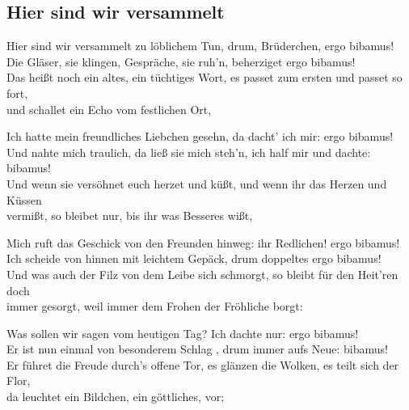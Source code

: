 
\subsection*{Hier sind wir versammelt}
%
%

\thestrophe Hier sind wir versammelt zu löblichem Tun, drum, Brüderchen, ergo bibamus! \\
Die Gläser, sie klingen, Gespräche, sie ruh'n, beherziget ergo bibamus! \\
Das heißt noch ein altes, ein tüchtiges Wort, es passet zum ersten und passet so fort, \\
und schallet ein Echo vom festlichen Ort, 

\thestrophe Ich hatte mein freundliches Liebchen gesehn, da dacht' ich mir: ergo bibamus! \\
Und nahte mich traulich, da ließ sie mich steh'n, ich half mir und dachte: bibamus! \\
Und wenn sie versöhnet euch herzet und küßt, und wenn ihr das Herzen und Küssen \\
vermißt, so bleibet nur, bis ihr was Besseres wißt, 

\thestrophe Mich ruft das Geschick von den Freunden hinweg: ihr Redlichen! ergo bibamus! \\
Ich scheide von hinnen mit leichtem Gepäck, drum doppeltes ergo bibamus! \\
Und was auch der Filz von dem Leibe sich schmorgt, so bleibt für den Heit'ren doch \\
immer gesorgt, weil immer dem Frohen der Fröhliche borgt: 

\thestrophe Was sollen wir sagen vom heutigen Tag? Ich dachte nur: ergo bibamus! \\
Er ist nun einmal von besonderem Schlag , drum immer aufs Neue: bibamus! \\
Er führet die Freude durch's offene Tor, es glänzen die Wolken, es teilt sich der Flor, \\
da leuchtet ein Bildchen, ein göttliches, vor; 